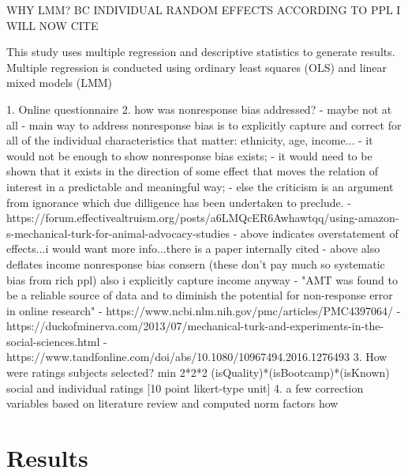 \documentclass[review]{elsarticle}
\begin{document}
WHY LMM? BC INDIVIDUAL RANDOM EFFECTS ACCORDING TO PPL I WILL NOW CITE

This study uses multiple regression and descriptive statistics to generate results.
Multiple regression is conducted using ordinary least squares (OLS)
and linear mixed models (LMM)

1. Online questionnaire
2. how was nonresponse bias addressed? - maybe not at all
- main way to address nonresponse bias is to explicitly capture and correct for all of the individual characteristics that matter: ethnicity, age, income...
- it would not be enough to show nonresponse bias exists;
- it would need to be shown that it exists in the direction of some effect that moves the relation of interest in a predictable and meaningful way;
- else the criticism is an argument from ignorance which due dilligence has been undertaken to preclude.
- https://forum.effectivealtruism.org/posts/a6LMQcER6Awhawtqq/using-amazon-s-mechanical-turk-for-animal-advocacy-studies
- above indicates overstatement of effects...i would want more info...there is a paper internally cited
- above also deflates income nonresponse bias consern (these don't pay much so systematic bias from rich ppl) also i explicitly capture income anyway
- "AMT was found to be a reliable source of data and to diminish the potential for non-response error in online research"
- https://www.ncbi.nlm.nih.gov/pmc/articles/PMC4397064/
- https://duckofminerva.com/2013/07/mechanical-turk-and-experiments-in-the-social-sciences.html
- https://www.tandfonline.com/doi/abs/10.1080/10967494.2016.1276493
3. How were ratings subjects selected? min 2*2*2 (isQuality)*(isBootcamp)*(isKnown) social and individual ratings [10 point likert-type unit]
4. a few correction variables based on literature review and computed norm factors how

\section{Results}

\end{document}
